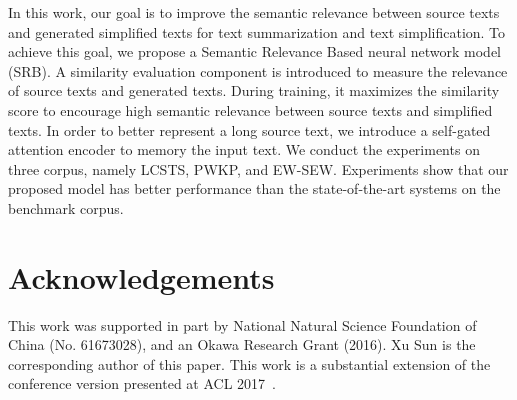 \documentclass{clv3}
\begin{document}
\begin{CJK*}{UTF8}{gbsn}
In this work, our goal is to improve the semantic relevance between source texts and generated simplified texts for text summarization and text simplification. To achieve this goal, we propose a Semantic Relevance Based neural network model (SRB). A similarity evaluation component is introduced to measure the relevance of source texts and generated texts. During training, it maximizes the similarity score to encourage high semantic relevance between source texts and simplified texts. In order to better represent a long source text, we introduce a self-gated attention encoder to memory the input text. We conduct the experiments on three corpus, namely LCSTS, PWKP, and EW-SEW. Experiments show that our proposed model has better performance than the state-of-the-art systems on the benchmark corpus.

\section*{Acknowledgements}

This work was supported in part by National Natural Science Foundation of China (No. 61673028), and an Okawa Research Grant (2016). Xu Sun is the corresponding author of this paper. This work is a substantial extension of the conference version presented at ACL 2017~\cite{srb}.

\starttwocolumn

\end{CJK*}
\end{document}
